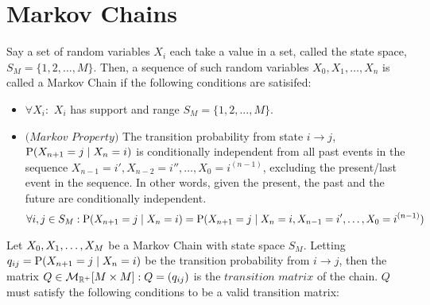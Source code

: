 \newpage
\section{Markov Chains}



\begin{definition} Say a set of random variables $X_i$ each take a value in a set, called the state space, $S_M = \{1,2,\dots,M\}$. Then, a sequence of such random variables $X_0,X_1,\dots,X_n$ is called a Markov Chain if the following conditions are satisifed:
\end{definition}

\begin{itemize}
\item $\forall X_i:$ $X_i$ has support and range $S_M = \{1,2,...,M\}$.
\item $\textit{(Markov Property)}$ The transition probability from state $i \to j$, $\Prb(X_{n+1} = j \mid X_n = i)$ is conditionally independent from all past events in the sequence $X_{n-1} = i',X_{n-2} = i'', \dots,X_0 = i^{(n-1)}$, excluding the present/last event in the sequence. In other words, given the present, the past and the future are conditionally independent.
$$\forall i,j \in S_M: \Prb(X_{n+1} = j \mid X_n = i) = \Prb(X_{n+1} = j \mid X_n = i, X_{n-1} = i', \dots,X_0 = i^{(n-1)})$$
\end{itemize}

\begin{definition}  Let $\seq[M]{X}$ be a Markov Chain with state space $S_M$. Letting $q_{ij} = \Prb(X_{n+1} = j \mid X_n = i)$ be the transition probability from $i \to j$, then the matrix $Q \in \mathcal{M}_{\R^+}[M\times M]: Q=(q_{ij})$ is the $\textit{transition matrix}$ of the chain. $Q$ must satisfy the following conditions to be a valid transition matrix:
\end{definition}


